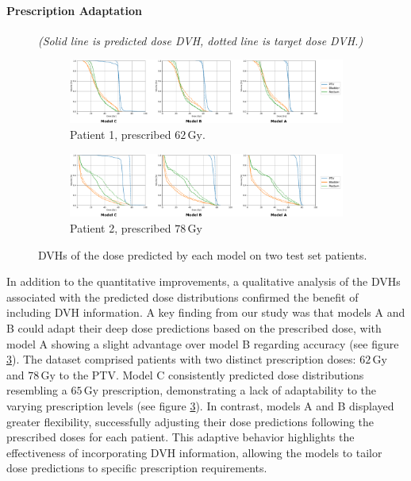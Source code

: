 \paragraph{Prescription Adaptation}
\begin{figure}
	\centering
	\textit{(Solid line is predicted dose DVH, dotted line is target dose DVH.)}
	\begin{subfigure}{\linewidth}
		\centering
		\includegraphics[width=\linewidth]{SFPM/test_patient_0.pdf}
		\caption{Patient 1, prescribed $62\,\text{Gy}$.}
		\label{fig:results_patient_1}
	\end{subfigure}
	\begin{subfigure}{\linewidth}
		\centering
		\includegraphics[width=\linewidth]{SFPM/test_patient_2.pdf}
		\caption{Patient 2, prescribed $78\,\text{Gy}$}
		\label{fig:results_patient_2}
	\end{subfigure}
	\caption{DVHs of the dose predicted by each model on two test set patients.}
	\label{fig:results_patients_12}
\end{figure}
In addition to the quantitative improvements, a qualitative analysis of the DVHs associated with the predicted dose distributions confirmed the benefit of including DVH information.
A key finding from our study was that models A and B could adapt their deep dose predictions based on the prescribed dose, with model A showing a slight advantage over model B regarding accuracy (see figure \ref{fig:results_patients_12}).
The dataset comprised patients with two distinct prescription doses: $62\,\text{Gy}$ and $78\,\text{Gy}$ to the PTV.
Model C consistently predicted dose distributions resembling a $65\,\text{Gy}$ prescription, demonstrating a lack of adaptability to the varying prescription levels (see figure \ref{fig:results_patients_12}).
In contrast, models A and B displayed greater flexibility, successfully adjusting their dose predictions following the prescribed doses for each patient.
This adaptive behavior highlights the effectiveness of incorporating DVH information, allowing the models to tailor dose predictions to specific prescription requirements.

